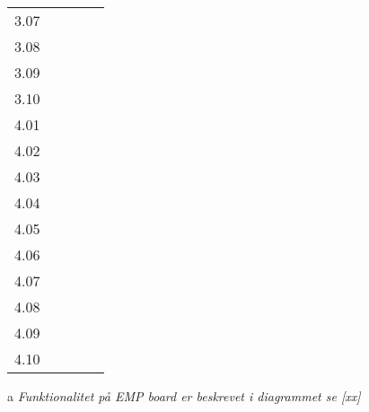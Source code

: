\begin{table}[h!]
\begin{threeparttable}
\begin{tabular}{l l l l l}
			3.07 &		&		&		&		\\
			3.08 &		&		&		&		\\
			3.09 &		&		&		&		\\
			3.10 &		&		&		&		\\
			\midrule
			4.01 &		&		&		&		\\
			4.02 &		&		&		&		\\
			4.03 &		&		&		&		\\
			4.04 &		&		&		&		\\
			4.05 &		&		&		&		\\
			4.06 &		&		&		&		\\
			4.07 &		&		&		&		\\
			4.08 &		&		&		&		\\
			4.09 &		&		&		&		\\
			4.10 &		&		&		&		\\
			\bottomrule
		\end{tabular}
	
		\begin{tablenotes}
			\item[a] \textit{Funktionalitet på EMP board er beskrevet i diagrammet se [xx] }
		\end{tablenotes}
	\end{threeparttable}
\end{table}
